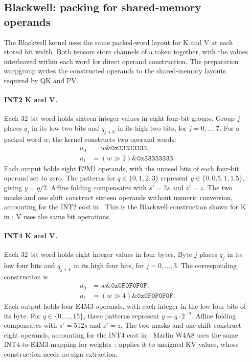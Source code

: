 \subsection{Blackwell: packing for shared-memory operands}

The Blackwell kernel uses the same packed-word layout for K and V at each stored bit width.
Both tensors store channels of a token together, with the values interleaved within each word for direct operand construction.
The preparation warpgroup writes the constructed operands to the shared-memory layouts required by QK and PV.

\paragraph{INT2 K and V.}
Each 32-bit word holds sixteen integer values in eight four-bit groups.
Group $j$ places $q_j$ in its low two bits and $q_{j+8}$ in its high two bits, for $j=0,\ldots,7$.
For a packed word $w$, the kernel constructs two operand words:
\begin{align*}
  u_0 &= w \mathbin{\&} \texttt{0x33333333},\\
  u_1 &= (w \gg 2) \mathbin{\&} \texttt{0x33333333}.
\end{align*}
Each output holds eight E2M1 operands, with the unused bits of each four-bit operand set to zero.
The patterns for $q\in\{0,1,2,3\}$ represent $y\in\{0,0.5,1,1.5\}$, giving $y=q/2$.
Affine folding compensates with $s'=2s$ and $z'=z$.
The two masks and one shift construct sixteen operands without numeric conversion, accounting for the INT2 cost in .
This is the Blackwell construction shown for K in ; V uses the same bit operations.

\paragraph{INT4 K and V.}
Each 32-bit word holds eight integer values in four bytes.
Byte $j$ places $q_j$ in its low four bits and $q_{j+4}$ in its high four bits, for $j=0,\ldots,3$.
The corresponding construction is
\begin{align*}
  u_0 &= w \mathbin{\&} \texttt{0x0F0F0F0F},\\
  u_1 &= (w \gg 4) \mathbin{\&} \texttt{0x0F0F0F0F}.
\end{align*}
Each output holds four E4M3 operands, with each integer in the low four bits of its byte.
For $q\in\{0,\ldots,15\}$, these patterns represent $y=q\cdot2^{-9}$.
Affine folding compensates with $s'=512s$ and $z'=z$.
The two masks and one shift construct eight operands, accounting for the INT4 cost in .
Marlin W4A8 uses the same INT4-to-E4M3 mapping for weights~\cite{lin2025marlinw4a8}; \sys{} applies it to unsigned KV values, whose construction needs no sign extraction.

